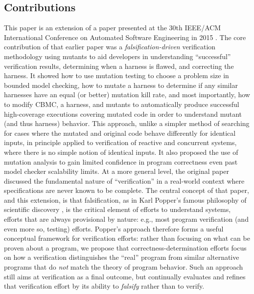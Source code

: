\documentclass{svjour3}
\begin{document}
\subsection{Contributions}

This paper is an extension of a paper presented at the 30th IEEE/ACM
International Conference on Automated Software Engineering in 2015
\cite{ase15}.  
The core contribution of that earlier paper was a \emph{falsification-driven}
verification methodology using mutants to aid developers 
 in understanding ``successful'' verification
results, determining when a harness is flawed, and correcting the harness.
It showed how to use mutation testing to
choose a problem size in bounded model checking, how to mutate a
harness to determine if any similar harnesses have an equal (or
better) mutation kill rate, and most importantly, how to modify CBMC,
a harness, and mutants to automatically produce successful
 high-coverage executions covering mutated code in order to
understand mutant (and thus harness) behavior.  This
approach, unlike a simpler method of searching for cases where the
mutated and original code behave differently for identical inputs,
in principle applied to verification of reactive and concurrent systems, where
there is no simple notion of identical inputs.  
It also proposed the use of mutation analysis to gain limited confidence
in program correctness even past model checker scalability limits. 
At a more general level, the original paper discussed the fundamental nature of
``verification'' in a real-world context where specifications are
never known to be complete.  The central concept of that paper, and
this extension, is that falsification, as in Karl
Popper's famous philosophy of scientific discovery \cite{Popper}, is
the critical element of efforts to understand systems, efforts that are always
provisional by nature:  e.g., most program verification (and even more
so, testing) efforts.  Popper's approach therefore forms a 
useful conceptual
framework for verification efforts: rather than focusing on what can
be proven about a program, we propose that correctness-determination efforts focus on how a
verification distinguishes the ``real'' program from similar
alternative programs that do \emph{not} match the theory of program
behavior.  Such an approach still aims at verification as a final outcome, but continually
evaluates and refines that verification effort by its ability to
\emph{falsify} rather than to verify.
\end{document}
